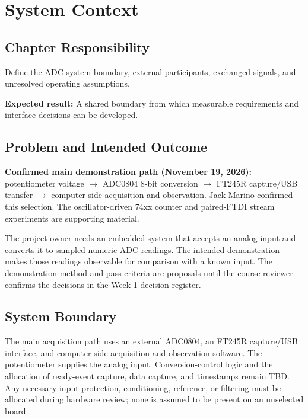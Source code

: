 \chapter{System Context}

\section{Chapter Responsibility}
\label{Section:SystemContextResponsibility}
Define the ADC system boundary, external participants, exchanged signals, and
unresolved operating assumptions.

\noindent\textbf{Expected result:} A shared boundary from which measurable
requirements and interface decisions can be developed.

\section{Problem and Intended Outcome}
\noindent\textbf{Confirmed main demonstration path (November 19, 2026):}
potentiometer voltage $\rightarrow$ ADC0804 8-bit conversion $\rightarrow$
FT245R capture/USB transfer $\rightarrow$ computer-side acquisition and
observation. Jack Marino confirmed this selection. The oscillator-driven
74xx counter and paired-FTDI stream experiments are supporting material.

The project owner needs an embedded system that accepts an analog input and
converts it to sampled numeric ADC readings. The intended demonstration makes
those readings observable for comparison with a known input. The demonstration
method and pass criteria are proposals until the course reviewer confirms the
decisions in \hyperref[Table:WeekOneTBDs]{the Week 1 decision register}.

\section{System Boundary}
The main acquisition path uses an external ADC0804, an FT245R capture/USB
interface, and computer-side acquisition and observation software. The
potentiometer supplies the analog input. Conversion-control logic and the
allocation of ready-event capture, data capture, and timestamps remain TBD. Any necessary input protection,
conditioning, reference, or filtering must be allocated during hardware review;
none is assumed to be present on an unselected board.

